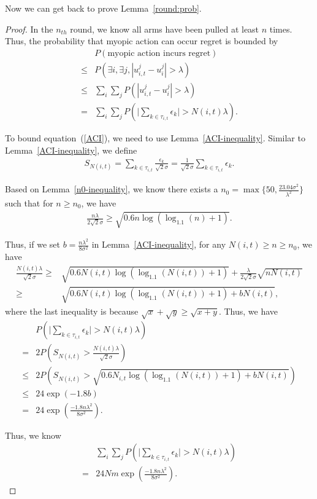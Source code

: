 \documentclass{article}
\begin{document}
Now we can get back to prove Lemma~\ref{round:prob}.

\begin{proof}
In the $n_{th}$ round, we know all arms have been pulled at least $n$ times. Thus, the probability that myopic action can occur regret is bounded by
\begin{align}
&P(\text{myopic action incurs regret})\nonumber \\
\leq &P(\exists i, \exists j, |u_{i,t}^{j}-u_{i}^{j}|>\lambda) \nonumber \\
\leq & \sum_{i}\sum_{j} P(|u_{i,t}^{j}-u_{i}^{j}|>\lambda) \nonumber \\
= &  \sum_{i}\sum_{j} P\left(\bigg|\sum_{k\in \tau_{i,t}}\epsilon_{k}\bigg|>N(i,t)\lambda\right). \label{ACI}
\end{align}

To bound equation~(\ref{ACI}), we need to use Lemma~\ref{ACI-inequality}. Similar to Lemma~\ref{ACI-inequality}, we define
\begin{align}
S_{N(i,t)}=\sum_{k\in\tau_{i,t}}\frac{\epsilon_{k}}{\sqrt{2}\sigma}=\frac{1}{\sqrt{2}\sigma}\sum_{k\in\tau_{i,t}}\epsilon_{k}. \nonumber
\end{align}

Based on Lemma~\ref{n0-inequality}, we know there exists a $n_{0}=\max\{50, \frac{23.04\sigma^2}{\lambda^2}\}$ such that for $n\geq n_{0}$, we have
\begin{align}
\frac{n\lambda}{2\sqrt{2}\sigma}\geq \sqrt{0.6n\log(\log_{1.1}(n)+1)}. \nonumber
\end{align}

Thus, if we set $b=\frac{n\lambda^2}{8\sigma^2}$ in Lemma~\ref{ACI-inequality}, for any $N(i,t)\geq n\geq n_{0}$, we have
\begin{align}
\frac{N(i,t)\lambda}{\sqrt{2}\sigma}\geq & \sqrt{0.6N(i,t)\log(\log_{1.1}(N(i,t))+1)}+\frac{\lambda}{2\sqrt{2}\sigma}\sqrt{n N(i,t)} \nonumber \\
\geq & \sqrt{0.6N(i,t)\log(\log_{1.1}(N(i,t))+1)+bN(i,t)}, \nonumber 
\end{align}
where the last inequality is because $\sqrt{x}+\sqrt{y}\geq \sqrt{x+y}$. Thus, we have
\begin{align}
&P\left(\bigg|\sum_{k\in \tau_{i,t}}\epsilon_{k}\bigg|>N(i,t)\lambda\right) \nonumber \\
=&2P\left(S_{N(i,t)}>\frac{N(i,t)\lambda}{\sqrt{2}\sigma}\right) \nonumber \\
\leq & 2P\left(S_{N(i,t)}> \sqrt{0.6 N_{i,t}\log(\log_{1.1}(N(i,t))+1)+b N(i,t)}\right) \nonumber \\
\leq & 24\exp( -1.8b) \nonumber \\
= & 24\exp\left(\frac{-1.8 n\lambda^2}{8\sigma^2}\right). \nonumber
\end{align}


Thus, we know
\begin{align}
&\sum_{i}\sum_{j} P\left(\bigg|\sum_{k\in \tau_{i,t}}\epsilon_{k}\bigg|>N(i,t)\lambda\right)  \nonumber \\
=& 24Nm \exp\left(\frac{-1.8 n\lambda^2}{8\sigma^2}\right). \nonumber
\end{align}

\end{proof}
\end{document}
